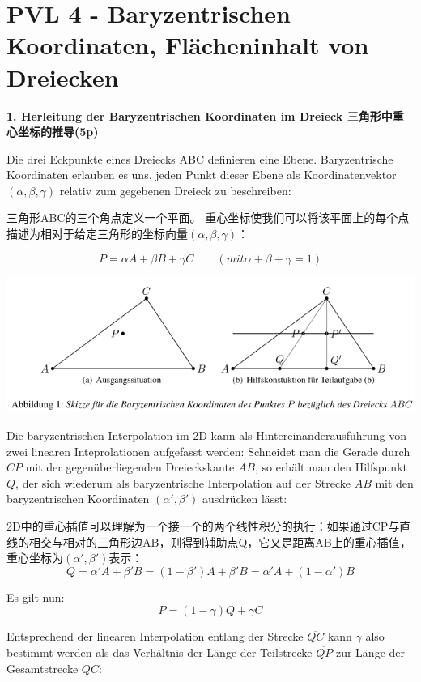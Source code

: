 \documentclass[fleqn]{article}
\begin{document}
\newpage

\section{PVL 4 - Baryzentrischen Koordinaten, Flächeninhalt von Dreiecken}

\noindent\textbf{1. Herleitung der Baryzentrischen Koordinaten im Dreieck 三角形中重心坐标的推导(5p)}

Die drei Eckpunkte eines Dreiecks ABC definieren eine Ebene. Baryzentrische Koordinaten erlauben es uns, jeden Punkt dieser Ebene als Koordinatenvektor $(\alpha,\beta,\gamma)$ relativ zum gegebenen Dreieck zu beschreiben:

三角形ABC的三个角点定义一个平面。 重心坐标使我们可以将该平面上的每个点描述为相对于给定三角形的坐标向量$(\alpha,\beta,\gamma)$：

$$P=\alpha A + \beta B + \gamma C \qquad (mit \alpha + \beta + \gamma =1)$$

\begin{center}
    \includegraphics[scale=0.6]{15.png}
\end{center}

Die baryzentrischen Interpolation im 2D kann als Hintereinanderausführung von zwei linearen Inteprolationen aufgefasst werden: Schneidet man die Gerade durch $\overline{CP}$ mit der gegenüberliegenden Dreieckskante $\overline{AB}$,
 so erhält man den Hilfspunkt $Q$, der sich wiederum als baryzentrische Interpolation auf der Strecke $AB$ mit den baryzentrischen Koordinaten $(\alpha',\beta')$ ausdrücken lässt:

2D中的重心插值可以理解为一个接一个的两个线性积分的执行：如果通过CP与直线的相交与相对的三角形边AB，则得到辅助点Q，它又是距离AB上的重心插值，重心坐标为$(\alpha',\beta')$表示：
$$Q=\alpha'A+\beta'B=(1-\beta')A+\beta'B=\alpha'A+(1-\alpha')B$$

Es gilt nun:
$$P=(1-\gamma)Q+\gamma C$$

Entsprechend der linearen Interpolation entlang der Strecke $\overline{QC}$ kann $\gamma$ also bestimmt werden als das Verhältnis der Länge der Teilstrecke $\overline{QP}$ zur Länge der Gesamtstrecke $\overline{QC}$:
\end{document}
